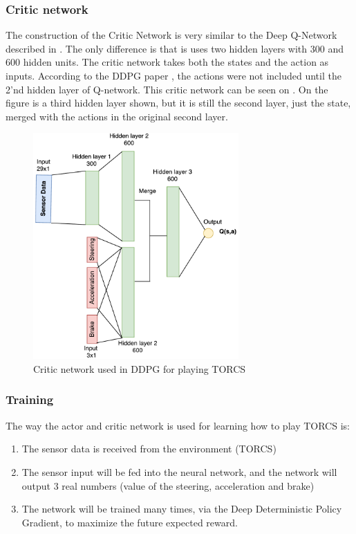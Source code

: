 \subsubsection{Critic network}
The construction of the Critic Network is very similar to the Deep Q-Network described in . The only difference is that is uses two hidden layers with 300 and 600 hidden units. The critic network takes both the states and the action as inputs. According to the DDPG paper \cite{DBLP:journals/corr/LillicrapHPHETS15}, the actions were not included until the 2’nd hidden layer of Q-network. This critic network can be seen on . On the figure is a third hidden layer shown, but it is still the second layer, just the state, merged with the actions in the original second layer. 

\begin{figure}[H]
	\centering
	\includegraphics[width=0.7\textwidth]{Figures/Architecture/DDPG/DDPG_Critic_network.pdf}
	\caption{Critic network used in DDPG for playing TORCS }
	\label{fig:DDPG_Critic_network}
\end{figure}  

\subsubsection{Training}
The way the actor and critic network is used for learning how to play TORCS is: 
\begin{enumerate}
	\item The sensor data is received from the environment (TORCS) 
	\item The sensor input will be fed into the neural network, and the network will output 3 real numbers (value of the steering, acceleration and brake)
	\item The network will be trained many times, via the Deep Deterministic Policy Gradient, to maximize the future expected reward.
\end{enumerate}

